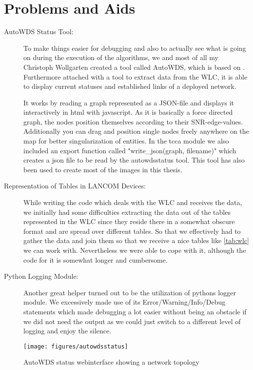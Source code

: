   \section{Problems and Aids}
    \begin{description}
    \item [AutoWDS Status Tool:]
	To make things easier for debugging and also to actually see what is going on during the execution of the algorithms,
	we and most of all my Christoph Wollgarten created a tool called AutoWDS, which is based on \cite{d3js}. 
	Furthermore attached with a tool to extract data from the WLC, it is able to display current statuses and established links of a deployed network.
	
	It works by reading a graph represented as a \ac{JSON}-file and displays it interactively in html with javascript.
	As it is basically a force directed graph, the nodes position themselves according to their SNR-edge-values. 
	Additionally you can drag and position single nodes freely anywhere on the map for better singularization of entities.
	In the tcca module we also included an export function called "write\_json(graph, filename)" which creates a json file to be read by the autowdsstatus tool.
	This tool has also been used to create most of the images in this thesis.
	
    \item [Representation of Tables in LANCOM Devices:]
	While writing the code which deals with the WLC and receives the data, we initially had some difficulties extracting the data out of the tables represented in the WLC since
	they reside there in a somewhat obscure format and are spread over different tables. So that we effectively had to gather the data and join them so that we receive a
	nice tables like \ref{tab:wlc} we can work with. Nevertheless we were able to cope with it, although the code for it is somewhat longer and cumbersome.
	
      \item [Python Logging Module:]
	Another great helper turned out to be the utilization of pythons logger module. We excessively made use of its Error/Warning/Info/Debug statements which made debugging
	a lot easier without being an obstacle if we did not need the output as we could just switch to a different level of logging and enjoy the silence.
    \end{description}

    \begin{figure}[h]
      \centering
      \texttt{[image: figures/autowdsstatus]}
      \caption{AutoWDS status webinterface showing a network topology}
      \label{fig:autowdsstatus}
    \end{figure}
  
\clearpage

  
